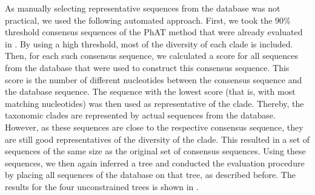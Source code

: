 As manually selecting representative sequences from the database was not practical,
we used the following automated approach.
First, we took the 90\% threshold consensus sequences of the \ac{PhAT} method
that were already evaluated in .
By using a high threshold, most of the diversity of each clade is included.
Then, for each such consensus sequence,
we calculated a score for all sequences from the database that were used to construct this consensus sequence.
This score is the number of different nucleotides between the consensus sequence and the database sequence.
The sequence with the lowest score (that is, with most matching nucleotides)
was then used as representative of the clade.
Thereby, the taxonomic clades are represented by actual sequences from the database.
However, as these sequences are close to the respective consensus sequence,
they are still good representatives of the diversity of the clade.
This resulted in a set of sequences of the same size as the original set of consensus sequences.
Using these sequences, we then again inferred a tree and
conducted the evaluation procedure by placing all sequences of the database on that tree,
as described before.
The results for the four unconstrained trees is shown in .

